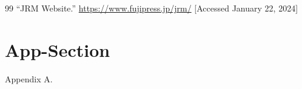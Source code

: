 \documentclass[authorproof,JRM,paper]{fujipressarticle}
\begin{document}
\vspace{5pt}
\noindent
\begin{onlinematerials}{99}
	``JRM Website.''
	\url{https://www.fujipress.jp/jrm/}
	[Accessed January 22, 2024]
\end{onlinematerials}



\appendix
\section{App-Section}
Appendix A.


\begin{profile}
\end{profile}
\end{document}
